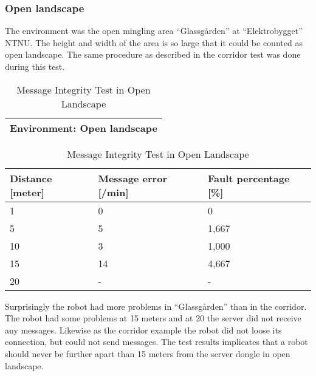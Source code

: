 \newpage
\subsubsection{Open landscape}
The environment was the open mingling area ``Glassgården'' at ``Elektrobygget'' NTNU. The height and width of the area is so large that it could be counted as open landscape.
The same procedure as described in the corridor test was done during this test.

\begin{table}[ht]
\begin{center}
 \begin{tabular}{|l|} 
 \hline
 Environment: \textbf{Open landscape}\\
 \hline
 \end{tabular}
 \begin{tabular}{|l|l|l|}
 \hline
 Distance [meter] & Message error [/min] &  Fault percentage [\%]\\
 \hline
 1		        &   0 		&	0    \\
 5              &   5  		&	1,667\\
 10             &   3  		&	1,000\\
 15				&	14 		&	4,667\\
 20				&	-  		&	-	\\
 \hline
\end{tabular}
\end{center}
\caption{Message Integrity Test in Open Landscape}
\label{tab:messintegrityopen}
\end{table}

Surprisingly the robot had more problems in ``Glassgården'' than in the corridor. The robot had some problems at 15 meters and at 20 the server did not receive any messages. Likewise as the corridor example the robot did not loose its connection, but could not send messages. The test results implicates that a robot should never be further apart than 15 meters from the server dongle in open landscape.